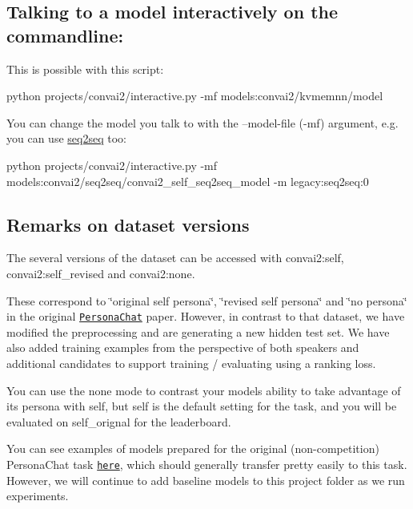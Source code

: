 \subsection*{Talking to a model interactively on the commandline\+:}

This is possible with this script\+:


\begin{DoxyCode}
python projects/convai2/interactive.py -mf models:convai2/kvmemnn/model
\end{DoxyCode}


You can change the model you talk to with the \textquotesingle{}--model-\/file\textquotesingle{} (-\/mf) argument, e.\+g. you can use \hyperlink{namespaceseq2seq}{seq2seq} too\+:


\begin{DoxyCode}
python projects/convai2/interactive.py -mf models:convai2/seq2seq/convai2\_self\_seq2seq\_model -m
       legacy:seq2seq:0
\end{DoxyCode}


\subsection*{Remarks on dataset versions}

The several versions of the dataset can be accessed with {\ttfamily convai2\+:self}, {\ttfamily convai2\+:self\+\_\+revised} and {\ttfamily convai2\+:none}.

These correspond to \char`\"{}original self persona\char`\"{}, \char`\"{}revised self persona\char`\"{} and \char`\"{}no persona\char`\"{} in the original \href{https://arxiv.org/pdf/1801.07243.pdf}{\tt Persona\+Chat} paper. However, in contrast to that dataset, we have modified the preprocessing and are generating a new hidden test set. We have also added training examples from the perspective of both speakers and additional candidates to support training / evaluating using a ranking loss.

You can use the {\ttfamily none} mode to contrast your model\textquotesingle{}s ability to take advantage of its persona with {\ttfamily self}, but {\ttfamily self} is the default setting for the task, and you will be evaluated on \textquotesingle{}self\+\_\+orignal\textquotesingle{} for the leaderboard.

You can see examples of models prepared for the original (non-\/competition) Persona\+Chat task \href{https://github.com/facebookresearch/ParlAI/tree/master/projects/personachat}{\tt here}, which should generally transfer pretty easily to this task. However, we will continue to add baseline models to this project folder as we run experiments. 